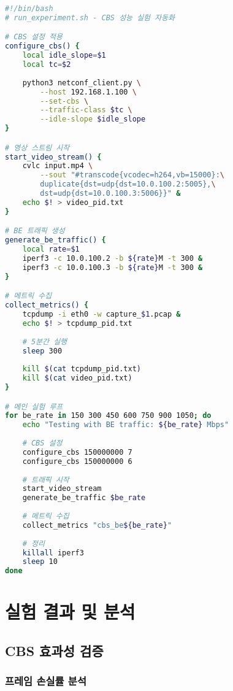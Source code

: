 \documentclass[twocolumn,10pt]{article}
\begin{document}
\begin{lstlisting}[language=bash, caption=실험 자동화 스크립트]
#!/bin/bash
# run_experiment.sh - CBS 성능 실험 자동화

# CBS 설정 적용
configure_cbs() {
    local idle_slope=$1
    local tc=$2
    
    python3 netconf_client.py \
        --host 192.168.1.100 \
        --set-cbs \
        --traffic-class $tc \
        --idle-slope $idle_slope
}

# 영상 스트림 시작
start_video_stream() {
    cvlc input.mp4 \
        --sout "#transcode{vcodec=h264,vb=15000}:\
        duplicate{dst=udp{dst=10.0.100.2:5005},\
        dst=udp{dst=10.0.100.3:5006}}" &
    echo $! > video_pid.txt
}

# BE 트래픽 생성
generate_be_traffic() {
    local rate=$1
    iperf3 -c 10.0.100.2 -b ${rate}M -t 300 &
    iperf3 -c 10.0.100.3 -b ${rate}M -t 300 &
}

# 메트릭 수집
collect_metrics() {
    tcpdump -i eth0 -w capture_$1.pcap &
    echo $! > tcpdump_pid.txt
    
    # 5분간 실행
    sleep 300
    
    kill $(cat tcpdump_pid.txt)
    kill $(cat video_pid.txt)
}

# 메인 실험 루프
for be_rate in 150 300 450 600 750 900 1050; do
    echo "Testing with BE traffic: ${be_rate} Mbps"
    
    # CBS 설정
    configure_cbs 150000000 7
    configure_cbs 150000000 6
    
    # 트래픽 시작
    start_video_stream
    generate_be_traffic $be_rate
    
    # 메트릭 수집
    collect_metrics "cbs_be${be_rate}"
    
    # 정리
    killall iperf3
    sleep 10
done
\end{lstlisting}

\section{실험 결과 및 분석}
\label{sec:results}

\subsection{CBS 효과성 검증}

\subsubsection{프레임 손실률 분석}
\end{document}
